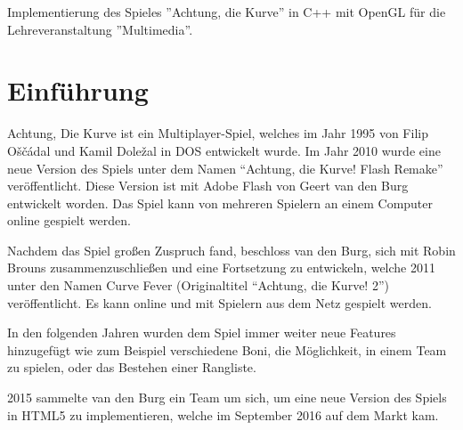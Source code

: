 \documentclass[doktyp=studarbeit]{TUBAFarbeiten}
\begin{document}
\maketitle

\TUBAFErklaerungsseite

Implementierung des Spieles ''Achtung, die Kurve'' in C++ mit OpenGL für die 
Lehreveranstaltung ''Multimedia''.




\tableofcontents
\listoffigures
\listoftables

\newpage

\section{Einführung}

Achtung, Die Kurve ist ein Multiplayer-Spiel, welches im Jahr 1995 von 
Filip Oščádal und Kamil Doležal in DOS entwickelt wurde. Im Jahr 2010 wurde 
eine neue Version des Spiels unter dem Namen “Achtung, die Kurve! Flash Remake”
veröffentlicht. Diese Version ist mit Adobe Flash von Geert van den Burg 
entwickelt worden. Das Spiel kann von mehreren Spielern an einem Computer online gespielt werden.

Nachdem das Spiel großen Zuspruch fand, beschloss van den Burg, sich mit 
Robin Brouns zusammenzuschließen und eine Fortsetzung zu entwickeln, welche 
2011 unter den Namen Curve Fever (Originaltitel “Achtung, die Kurve! 2”) 
veröffentlicht. Es kann online und mit Spielern aus dem Netz gespielt werden.

In den folgenden Jahren wurden dem Spiel immer weiter neue Features 
hinzugefügt wie zum Beispiel verschiedene Boni, die Möglichkeit, in einem Team 
zu spielen, oder das Bestehen einer Rangliste.

2015 sammelte van den Burg ein Team um sich, um eine neue Version des Spiels in 
HTML5 zu implementieren, welche im September 2016 auf dem Markt kam.
\end{document}
